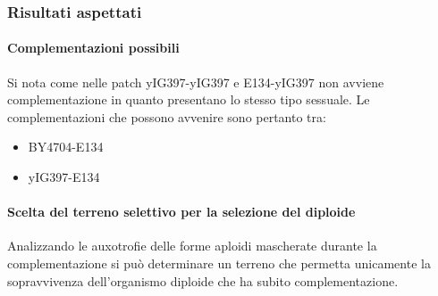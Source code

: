 		\subsubsection*{Risultati aspettati}

			\paragraph*{Complementazioni possibili}
			Si nota come nelle patch yIG397-yIG397 e E134-yIG397 non avviene complementazione in quanto presentano lo stesso tipo sessuale.
			Le complementazioni che possono avvenire sono pertanto tra:
			\begin{multicols}{2}
				\begin{itemize}
					\item BY4704-E134
					\item yIG397-E134
				\end{itemize}
			\end{multicols}

			\paragraph*{Scelta del terreno selettivo per la selezione del diploide}
			Analizzando le auxotrofie delle forme aploidi mascherate durante la complementazione si pu\`o determinare un terreno che permetta unicamente la sopravvivenza dell'organismo diploide che ha subito complementazione.
				
